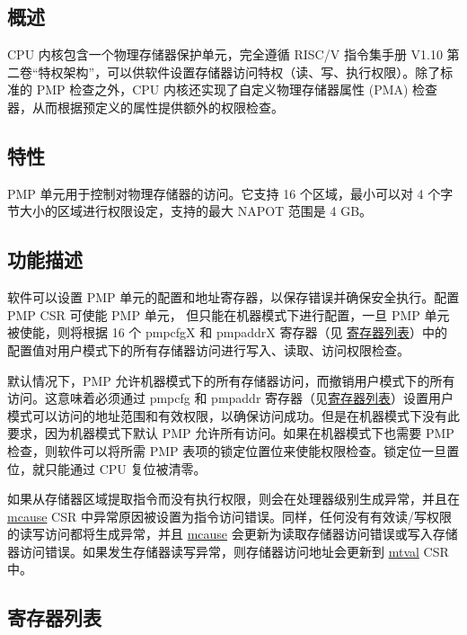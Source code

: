 \documentclass[main\_\_CN.tex]{subfiles}
\begin{document}
\subsection{概述}
\label{sec:riscvcpu-pmp-overview}
CPU 内核包含一个物理存储器保护单元，完全遵循 RISC\-/V 指令集手册 V1.10 第二卷“特权架构”，可以供软件设置存储器访问特权（读、写、执行权限）。除了标准的 PMP 检查之外，CPU 内核还实现了自定义物理存储器属性 (PMA) 检查器，从而根据预定义的属性提供额外的权限检查。

\subsection{特性}
\label{sec:riscvcpu-pmp-features}
PMP 单元用于控制对物理存储器的访问。它支持 16 个区域，最小可以对 4 个字节大小的区域进行权限设定，支持的最大 NAPOT 范围是 4 GB。

\subsection{功能描述}
\label{sec:riscvcpu-pmp-func-descr}

软件可以设置 PMP 单元的配置和地址寄存器，以保存错误并确保安全执行。配置 PMP CSR 可使能 PMP 单元， 但只能在机器模式下进行配置，一旦 PMP 单元被使能，则将根据 16 个 pmpcfgX 和 pmpaddrX 寄存器（见 \hyperref[sec:riscvcpu-pmp-reg-summ]{寄存器列表}）中的配置值对用户模式下的所有存储器访问进行写入、读取、访问权限检查。

默认情况下，PMP 允许机器模式下的所有存储器访问，而撤销用户模式下的所有访问。这意味着必须通过 pmpcfg 和 pmpaddr 寄存器（见\hyperref[sec:riscvcpu-pmp-reg-summ]{寄存器列表}）设置用户模式可以访问的地址范围和有效权限，以确保访问成功。但是在机器模式下没有此要求，因为机器模式下默认 PMP 允许所有访问。如果在机器模式下也需要 PMP 检查，则软件可以将所需 PMP 表项的锁定位置位来使能权限检查。锁定位一旦置位，就只能通过 CPU 复位被清零。

如果从存储器区域提取指令而没有执行权限，则会在处理器级别生成异常，并且在 \hyperref[regdesc:MCAUSE]{mcause} CSR 中异常原因被设置为指令访问错误。同样，任何没有有效读/写权限的读写访问都将生成异常，并且 \hyperref[regdesc:MCAUSE]{mcause} 会更新为读取存储器访问错误或写入存储器访问错误。如果发生存储器读写异常，则存储器访问地址会更新到 \hyperref[regdesc:MTVAL]{mtval} CSR 中。


\hypertarget{riscvcpu-pmp-reg-summ}{}
\subsection{寄存器列表}
\label{sec:riscvcpu-pmp-reg-summ}
\end{document}

